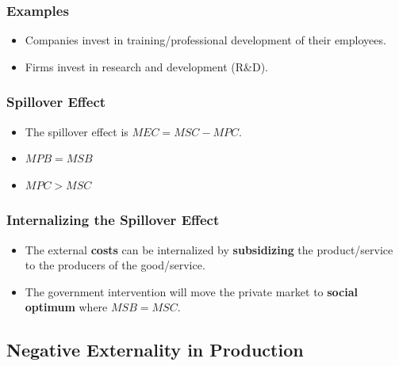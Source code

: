 \documentclass[
  letterpaper,
  DIV=11,
  numbers=noendperiod]{scrartcl}
\providecommand{\tightlist}{%
  \setlength{\itemsep}{0pt}\setlength{\parskip}{0pt}}\usepackage{longtable,booktabs,array}
\begin{document}
\subsubsection{Examples}\label{examples-4}

\begin{itemize}
\tightlist
\item
  Companies invest in training/professional development of their
  employees.
\item
  Firms invest in research and development (R\&D).
\end{itemize}

\subsubsection{Spillover Effect}\label{spillover-effect-2}

\begin{itemize}
\tightlist
\item
  The spillover effect is \(MEC = MSC-MPC\).
\item
  \(MPB = MSB\)
\item
  \(MPC > MSC\)
\end{itemize}

\subsubsection{Internalizing the Spillover
Effect}\label{internalizing-the-spillover-effect-2}

\begin{itemize}
\tightlist
\item
  The external \textbf{costs} can be internalized by
  \textbf{subsidizing} the product/service to the producers of the
  good/service.
\item
  The government intervention will move the private market to
  \textbf{social optimum} where \(MSB = MSC\).
\end{itemize}

\newpage{}

\subsection{Negative Externality in
Production}\label{negative-externality-in-production}
\end{document}
